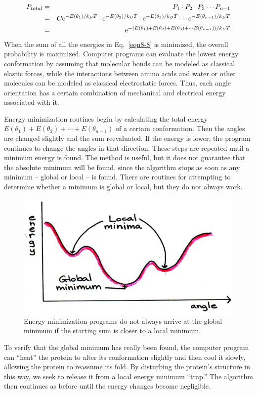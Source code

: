 \begin{eqnarray}\label{eqn8-8}
P_{total} &=& P_1 \cdot P_2 \cdot P_3 \cdots P_{n-1}\nonumber\\
&=& C{\rm e}^{-E\left(\theta_1\right)/k_BT}\cdot{\rm e}^{-E\left(\theta_2\right)/k_BT}\cdot{\rm e}^{-E\left(\theta_3\right)/k_BT}\cdots{\rm e}^{-E\left(\theta_{n-1}\right)/k_BT}\nonumber\\
&=& {\rm e}^{-\left(E\left(\theta_1\right)+E\left(\theta_2\right)+E\left(\theta_3\right)+\cdots E\left(\theta_{n-1}\right)\right)/k_BT}
\end{eqnarray}
When the sum of all the energies in Eq.~\ref{eqn8-8} is minimized, the overall probability is maximized.  Computer programs can evaluate the lowest energy conformation by assuming that molecular bonds can be modeled as classical elastic forces, while the interactions between amino acids and water or other molecules can be modeled as classical electrostatic forces.  Thus, each angle orientation has a certain combination of mechanical and electrical energy associated with it.

Energy minimization routines begin by calculating the total energy $E(\theta_1) + E(\theta_2) + \cdots + E(\theta_{n-1})$ of a certain conformation.  Then the angles are changed slightly and the sum reevaluated.  If the energy is lower, the program continues to change the angles in that direction.  These steps are repeated until a minimum energy is found.  The method is useful, but it does not guarantee that the absolute minimum will be found, since the algorithm stops as soon as any minimum -- global or local -- is found. There are routines for attempting to determine whether a minimum is global or local, but they do not always work.  
\begin{figure}[htb]
 	\centering
 	\includegraphics[width=\textwidth]{./figures/Topic8/Fig8-7.jpg}
 	\caption{Energy minimization programs do not always arrive at the global minimum if the starting sum is closer to a local minimum.}
  	\label{Fig8-7}
\end{figure}
To verify that the global minimum has really been found, the computer program can ``heat'' the protein to alter its conformation slightly and then cool it slowly, allowing the protein to reassume its fold.  By disturbing the protein's structure in this way, we seek to release it from a local energy minimum ``trap.''  The algorithm then continues as before until the energy changes become negligible.
